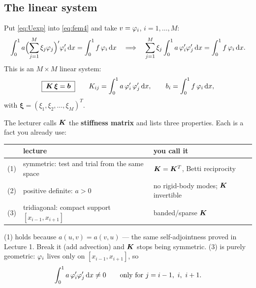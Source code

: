 \subsection*{The linear system}

Put \eqref{eq:Uexp} into \eqref{eq:fem4} and take $v=\varphi_{i}$,
$i=1,\dots,M$:
\begin{equation}
  \int_{0}^{1} a\Bigl(\sum_{j=1}^{M}\xi_{j}\varphi_{j}\Bigr)'\varphi_{i}'\,\mathrm{d} x
  = \int_{0}^{1} f\,\varphi_{i}\,\mathrm{d} x
  \quad\Longrightarrow\quad
  \sum_{j=1}^{M}\xi_{j}\int_{0}^{1} a\,\varphi_{i}'\varphi_{j}'\,\mathrm{d} x
  = \int_{0}^{1} f\,\varphi_{i}\,\mathrm{d} x .
\end{equation}
This is an $M\times M$ linear system:
\begin{equation}\label{eq:system}
  \boxed{\;\bm{K}\,\bm{\xi}=\bm{b}\;}
  \qquad
  K_{ij}=\int_{0}^{1} a\,\varphi_{i}'\,\varphi_{j}'\,\mathrm{d} x,
  \qquad
  b_{i}=\int_{0}^{1} f\,\varphi_{i}\,\mathrm{d} x,
\end{equation}
with $\bm{\xi}=(\xi_{1},\xi_{2},\dots,\xi_{M})^{T}$.

\begin{mechanics}
The lecturer calls $\bm{K}$ the \textbf{stiffness matrix} and lists three
properties. Each is a fact you already use:
\begin{center}\small
\renewcommand{\arraystretch}{1.25}
\begin{tabular}{@{}lll@{}}
\toprule
 & \textbf{lecture} & \textbf{you call it}\\
\midrule
(1) & symmetric: test and trial from the same space & $\bm{K}=\bm{K}^{T}$, Betti reciprocity\\
(2) & positive definite: $a>0$                       & no rigid-body modes; $\bm{K}$ invertible\\
(3) & tridiagonal: compact support $[x_{i-1},x_{i+1}]$ & banded/sparse $\bm{K}$\\
\bottomrule
\end{tabular}
\end{center}

\noindent
(1) holds because $a(u,v)=a(v,u)$ --- the same self-adjointness proved in
Lecture 1. Break it (add advection) and $\bm{K}$ stops being symmetric.
(3) is purely geometric: $\varphi_{i}$ lives only on $[x_{i-1},x_{i+1}]$, so
\[
  \int_{0}^{1} a\,\varphi_{i}'\varphi_{j}'\,\mathrm{d} x \ne 0
  \qquad\text{only for } j=i-1,\ i,\ i+1 .
\]
\end{mechanics}

